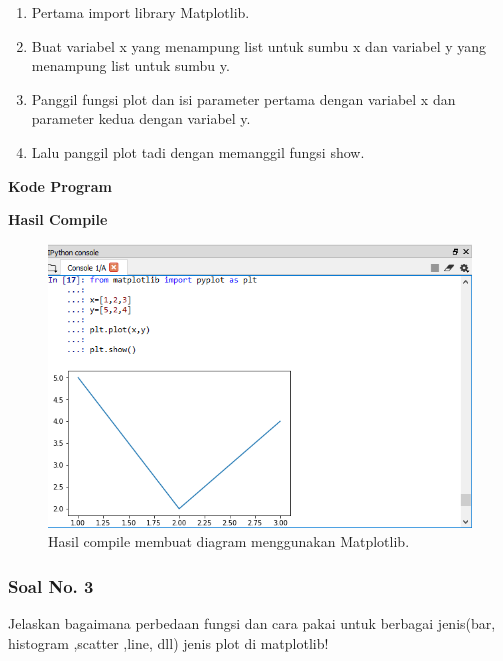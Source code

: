 \begin{enumerate}
	\item Pertama import library Matplotlib.	
	
	
	\item Buat variabel x yang menampung list untuk sumbu x dan variabel y yang menampung list untuk sumbu y.	
	
	
	\item Panggil fungsi plot dan isi parameter pertama dengan variabel x dan parameter kedua dengan variabel y.
		

	\item Lalu panggil plot tadi dengan memanggil fungsi show.
	
	
\end{enumerate}
\hfill \break
\textbf{Kode Program}



\hfill \break
\textbf{Hasil Compile}

\begin{figure}[H]
	\includegraphics[width=12cm]{figures/6/1174089/Praktek/2.png}
	\centering
	\caption{Hasil compile membuat diagram menggunakan Matplotlib.}
\end{figure}
 
\subsubsection{Soal No. 3}
\hfill \break
Jelaskan bagaimana perbedaan fungsi dan cara pakai untuk berbagai jenis(bar, histogram ,scatter ,line, dll) jenis plot di matplotlib!

